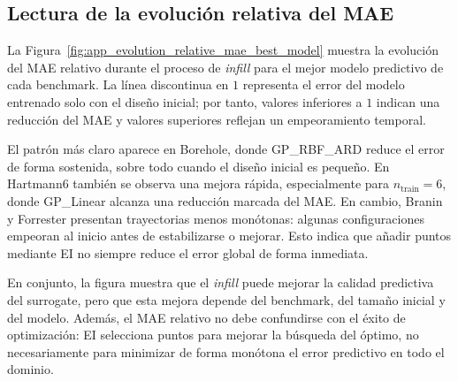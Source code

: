 
\subsection*{Lectura de la evolución relativa del MAE}

La Figura~\ref{fig:app_evolution_relative_mae_best_model} muestra la evolución del MAE relativo durante el proceso de \emph{infill} para el mejor modelo predictivo de cada benchmark. La línea discontinua en \(1\) representa el error del modelo entrenado solo con el diseño inicial; por tanto, valores inferiores a \(1\) indican una reducción del MAE y valores superiores reflejan un empeoramiento temporal.

El patrón más claro aparece en Borehole, donde GP\_RBF\_ARD reduce el error de forma sostenida, sobre todo cuando el diseño inicial es pequeño. En Hartmann6 también se observa una mejora rápida, especialmente para \(n_{\mathrm{train}}=6\), donde GP\_Linear alcanza una reducción marcada del MAE. En cambio, Branin y Forrester presentan trayectorias menos monótonas: algunas configuraciones empeoran al inicio antes de estabilizarse o mejorar. Esto indica que añadir puntos mediante EI no siempre reduce el error global de forma inmediata.

En conjunto, la figura muestra que el \emph{infill} puede mejorar la calidad predictiva del surrogate, pero que esta mejora depende del benchmark, del tamaño inicial y del modelo. Además, el MAE relativo no debe confundirse con el éxito de optimización: EI selecciona puntos para mejorar la búsqueda del óptimo, no necesariamente para minimizar de forma monótona el error predictivo en todo el dominio.
